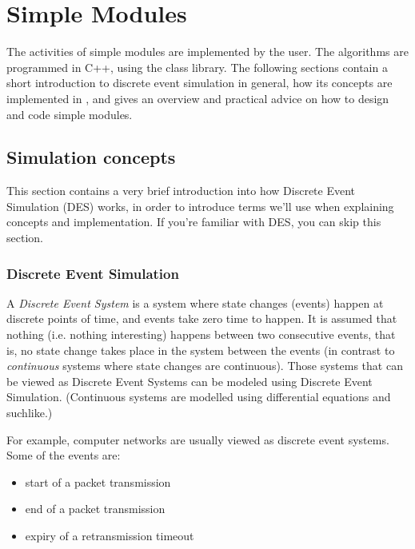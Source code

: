 \chapter{Simple Modules}
\label{cha:simple-modules}

The activities of simple modules are implemented by the user.
The algorithms are programmed in C++, using the {\opp} class
library. The following sections contain a short introduction
to discrete event simulation in general, how its concepts are
implemented in {\opp}, and gives an overview and practical advice
on how to design and code simple modules.





\section{Simulation concepts}

This section contains a very brief introduction into how Discrete
Event Simulation (DES) works, in order to introduce terms we'll use
when explaining {\opp} concepts and
implementation. If you're familiar with DES, you can skip this
section.





\subsection{Discrete Event Simulation}

A \textit{Discrete Event System} is a system where state changes
(events) happen at discrete points of time, and events take zero time
to happen. It is assumed that nothing (i.e. nothing interesting)
happens between two consecutive events, that is, no state change takes
place in the system between the events (in contrast to
\textit{continuous} systems where state changes are continuous). Those
systems that can be viewed as Discrete Event Systems can be modeled
using Discrete Event Simulation.
(Continuous systems are modelled using differential equations and
suchlike.)

For example, computer networks are usually viewed as discrete
event systems. Some of the events are:
\begin{itemize}
\item{start of a packet transmission}
\item{end of a packet transmission}
\item{expiry of a retransmission timeout}
\end{itemize}


